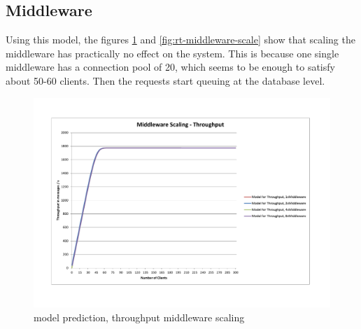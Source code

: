 \documentclass[a4paper]{article}
\begin{document}
\subsection{Middleware}

Using this model, the figures \ref{fig:tp-middleware-scale} and \ref{fig:rt-middleware-scale} show that scaling the middleware has practically no effect on the system. This is because one single middleware has a connection pool of 20, which seems to be enough to satisfy about 50-60 clients. Then the requests start queuing at the database level.\\

\begin{landscape}\begin{figure}[H]
	\begin{center}
    \includegraphics[scale=0.7, trim = 23mm 28mm 24mm 25mm, clip]{measurements_increase_load/tp_middleware_scaling.pdf}
  \end{center}
  \caption{model prediction, throughput middleware scaling}
  \label{fig:tp-middleware-scale}
\end{figure}


\end{landscape}
\end{document}
